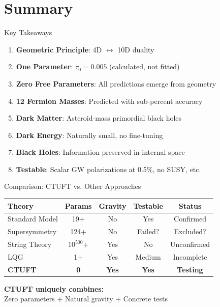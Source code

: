 \documentclass[aspectratio=169]{beamer}
\begin{document}
\section{Summary}

\begin{frame}{Key Takeaways}
\begin{enumerate}
    \item \textbf{Geometric Principle}: 4D $\leftrightarrow$ 10D duality
    
    \item \textbf{One Parameter}: $\tau_0 = 0.005$ (calculated, not fitted)
    
    \item \textbf{Zero Free Parameters}: All predictions emerge from geometry
    
    \item \textbf{12 Fermion Masses}: Predicted with sub-percent accuracy
    
    \item \textbf{Dark Matter}: Asteroid-mass primordial black holes
    
    \item \textbf{Dark Energy}: Naturally small, no fine-tuning
    
    \item \textbf{Black Holes}: Information preserved in internal space
    
    \item \textbf{Testable}: Scalar GW polarizations at 0.5\%, no SUSY, etc.
\end{enumerate}
\end{frame}

\begin{frame}{Comparison: CTUFT vs. Other Approaches}
\begin{center}
\begin{tabular}{lcccc}
\toprule
\textbf{Theory} & \textbf{Params} & \textbf{Gravity} & \textbf{Testable} & \textbf{Status} \\
\midrule
Standard Model & 19+ & No & Yes & Confirmed \\
Supersymmetry & 124+ & No & Failed? & Excluded? \\
String Theory & $10^{500}$+ & Yes & No & Unconfirmed \\
LQG & 1+ & Yes & Medium & Incomplete \\
\textbf{CTUFT} & \textbf{0} & \textbf{Yes} & \textbf{Yes} & \textbf{Testing} \\
\bottomrule
\end{tabular}
\end{center}

\vspace{0.5cm}
\begin{center}
\textbf{CTUFT uniquely combines:}\\
Zero parameters + Natural gravity + Concrete tests
\end{center}
\end{frame}
\end{document}
